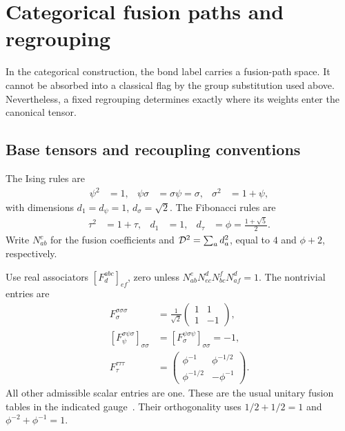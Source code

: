 \section{Categorical fusion paths and regrouping}
\label{sec:intrinsic-categories}

In the categorical construction, the bond label carries a fusion-path
space. It cannot be absorbed into a classical flag by the group
substitution used above. Nevertheless, a fixed regrouping determines
exactly where its weights enter the canonical tensor.

\subsection{Base tensors and recoupling conventions}

The Ising rules are
\begin{align}
	\psi^2     & =1,                 &
	\psi\sigma & =\sigma\psi=\sigma, &
	\sigma^2   & =1+\psi,
\end{align}
with dimensions $d_1=d_\psi=1$, $d_\sigma=\sqrt2$.
The Fibonacci rules are
\begin{align}
	\tau^2 & =1+\tau,                  &
	d_1    & =1,                       &
	d_\tau & =\phi=\frac{1+\sqrt5}{2}.
\end{align}
Write $N_{ab}^c$ for the fusion coefficients and
$\mathcal{D}^2=\sum_ad_a^2$, equal to $4$ and $\phi+2$, respectively.

Use real associators $[F^{abc}_d]_{ef}$, zero unless
$N_{ab}^eN_{ec}^dN_{bc}^fN_{af}^d=1$. The nontrivial entries are
\begin{align}
	F^{\sigma\sigma\sigma}_\sigma
	 & =\frac1{\sqrt2}
	\begin{pmatrix}1&1\\1&-1\end{pmatrix},             \\
	[F^{\sigma\psi\sigma}_\psi]_{\sigma\sigma}
	 & =[F^{\psi\sigma\psi}_\sigma]_{\sigma\sigma}=-1, \\
	F^{\tau\tau\tau}_\tau
	 & =\begin{pmatrix}
		    \phi^{-1}   & \phi^{-1/2} \\
		    \phi^{-1/2} & -\phi^{-1}
	    \end{pmatrix}.
	\label{eq:F-tables}
\end{align}
All other admissible scalar entries are one. These are the usual
unitary fusion tables in the indicated gauge~\cite{Bultinck}.
Their orthogonality uses
$1/2+1/2=1$ and $\phi^{-2}+\phi^{-1}=1$.

